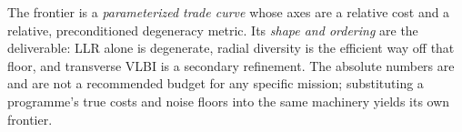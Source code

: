\begin{remark}
The frontier is a \emph{parameterized trade curve} whose axes are a relative cost
and a relative, preconditioned degeneracy metric. Its \emph{shape and ordering}
are the deliverable: LLR alone is degenerate, radial diversity is the efficient way
off that floor, and transverse VLBI is a secondary refinement. The absolute
numbers are \Modelled{} and are not a recommended budget for any specific mission;
substituting a programme's true costs and noise floors into the same machinery
yields its own frontier.
\end{remark}
